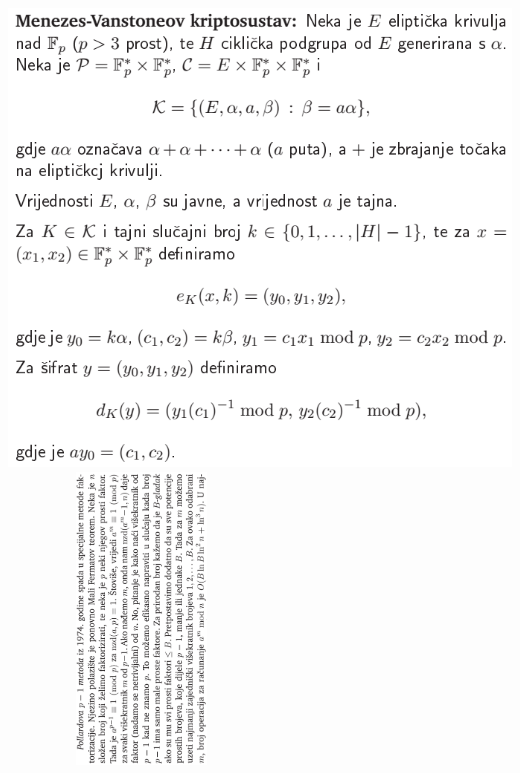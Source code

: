 \documentclass[12pt, a4paper]{article}
\begin{document}
\includegraphics[scale=0.5]{mens.png}
\includegraphics[height=220pt, width=200pt]{pollard.png}
\end{document}
